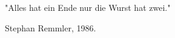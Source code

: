 "Alles hat ein Ende nur die Wurst hat zwei."

\begin{flushright}
Stephan Remmler, 1986.
\end{flushright}
